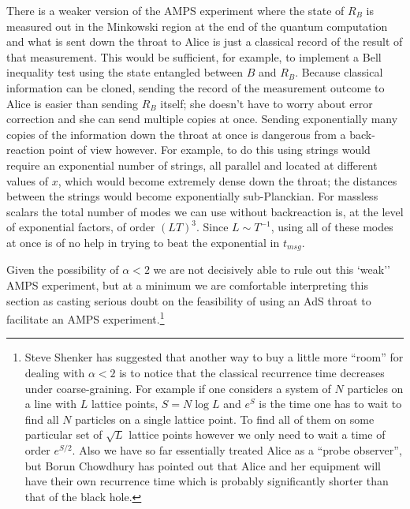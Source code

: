 \documentclass[12pt]{article}
\begin{document}
There is a weaker version of the AMPS experiment where the state of $R_B$ is measured out in the Minkowski region at the end of the quantum computation and what is sent down the throat to Alice is just a classical record of the result of that measurement. This would be sufficient, for example, to implement a Bell inequality test using the state entangled between $B$ and $R_B$. Because classical information can be cloned, sending the record of the measurement outcome to Alice is easier than sending $R_B$ itself; she doesn't have to worry about error correction and she can send multiple copies at once. Sending exponentially many copies of the information down the throat at once is dangerous from a back-reaction point of view however.  For example, to do this using strings would require an exponential number of strings, all parallel and located at different values of $x$, which would become extremely dense down the throat; the distances between the strings would become exponentially sub-Planckian.  For massless scalars the total number of modes we can use without backreaction is, at the level of exponential factors,  of order $(LT)^3$.  Since $L \sim T^{-1}$, using all of these modes at once is of no help in trying to beat the exponential in $t_{msg}$.  

Given the possibility of $\alpha<2$ we are not decisively able to rule out this `weak'' AMPS experiment, but at a minimum we are comfortable interpreting this section as casting serious doubt on the feasibility of using an AdS throat to facilitate an AMPS experiment.\footnote{Steve Shenker has suggested that another way to buy a little more ``room'' for dealing with $\alpha<2$ is to notice that the classical recurrence time decreases under coarse-graining.  For example if one considers a system of $N$ particles on a line with $L$ lattice points, $S=N \log L$ and $e^S$ is the time one has to wait to find all $N$ particles on a single lattice point.  To find all of them on some particular set of $\sqrt{L}$ lattice points however we only need to wait a time of order $e^{S/2}$.  Also we have so far essentially treated Alice as a ``probe observer'', but Borun Chowdhury has pointed out that Alice and her equipment will have their own recurrence time which is  probably significantly shorter than that of the black hole.}  
\end{document}

